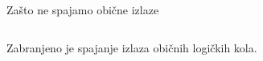 \begin{frame}[label=09_3-s045]{Zašto ne spajamo obične izlaze}
\begin{columns}[c,onlytextwidth]
\begin{center}

\end{center}
\begin{center}

\end{center}
\end{columns}\begin{center}

\end{center}\centering\alert{Zabranjeno je spajanje izlaza običnih logičkih kola.}
\end{frame}
